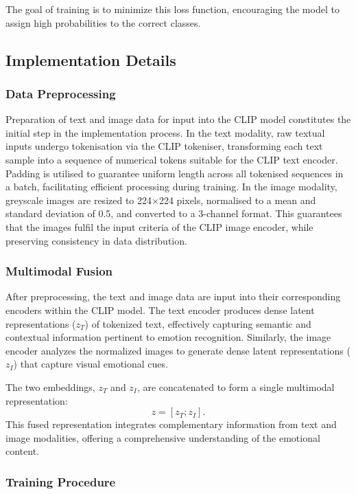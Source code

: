 \documentclass{article}
\theoremstyle{plain}
\theoremstyle{definition}
\theoremstyle{remark}
\begin{document}
The goal of training is to minimize this loss function, encouraging the model to assign high probabilities to the correct classes.
\subsection{Implementation Details}
\subsubsection{Data Preprocessing}

Preparation of text and image data for input into the CLIP model constitutes the initial step in the implementation process. In the text modality, raw textual inputs undergo tokenisation via the CLIP tokeniser, transforming each text sample into a sequence of numerical tokens suitable for the CLIP text encoder. Padding is utilised to guarantee uniform length across all tokenised sequences in a batch, facilitating efficient processing during training. In the image modality, greyscale images are resized to 224×224 pixels, normalised to a mean and standard deviation of 0.5, and converted to a 3-channel format. This guarantees that the images fulfil the input criteria of the CLIP image encoder, while preserving consistency in data distribution.

\subsubsection{Multimodal Fusion}

After preprocessing, the text and image data are input into their corresponding encoders within the CLIP model. The text encoder produces dense latent representations (\(z_T\)) of tokenized text, effectively capturing semantic and contextual information pertinent to emotion recognition. Similarly, the image encoder analyzes the normalized images to generate dense latent representations (\(z_I\)) that capture visual emotional cues. 

The two embeddings, \(z_T\) and \(z_I\), are concatenated to form a single multimodal representation:
\[
z = [z_T; z_I].
\]
This fused representation integrates complementary information from text and image modalities, offering a comprehensive understanding of the emotional content.

\subsubsection{Training Procedure}
\end{document}

